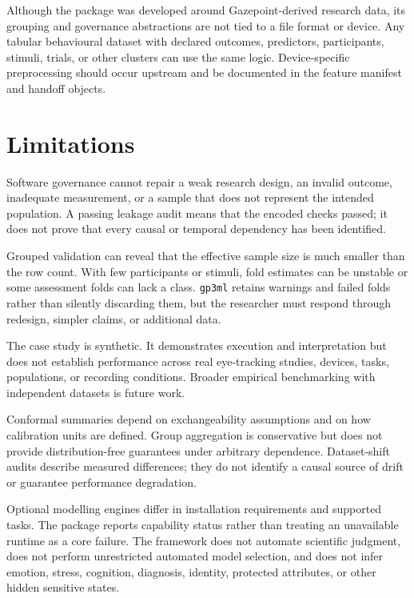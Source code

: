 Although the package was developed around Gazepoint-derived research data, its grouping and governance abstractions are not tied to a file format or device. Any tabular behavioural dataset with declared outcomes, predictors, participants, stimuli, trials, or other clusters can use the same logic. Device-specific preprocessing should occur upstream and be documented in the feature manifest and handoff objects.

\section{Limitations}\label{limitations}

Software governance cannot repair a weak research design, an invalid outcome, inadequate measurement, or a sample that does not represent the intended population. A passing leakage audit means that the encoded checks passed; it does not prove that every causal or temporal dependency has been identified.

Grouped validation can reveal that the effective sample size is much smaller than the row count. With few participants or stimuli, fold estimates can be unstable or some assessment folds can lack a class. \texttt{gp3ml} retains warnings and failed folds rather than silently discarding them, but the researcher must respond through redesign, simpler claims, or additional data.

The case study is synthetic. It demonstrates execution and interpretation but does not establish performance across real eye-tracking studies, devices, tasks, populations, or recording conditions. Broader empirical benchmarking with independent datasets is future work.

Conformal summaries depend on exchangeability assumptions and on how calibration units are defined. Group aggregation is conservative but does not provide distribution-free guarantees under arbitrary dependence. Dataset-shift audits describe measured differences; they do not identify a causal source of drift or guarantee performance degradation.

Optional modelling engines differ in installation requirements and supported tasks. The package reports capability status rather than treating an unavailable runtime as a core failure. The framework does not automate scientific judgment, does not perform unrestricted automated model selection, and does not infer emotion, stress, cognition, diagnosis, identity, protected attributes, or other hidden sensitive states.

